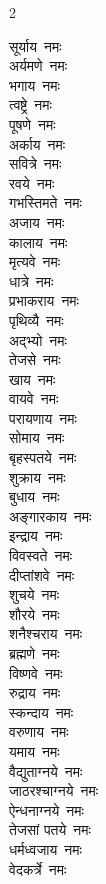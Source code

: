 \begin{multicols}{2}
    \begin{flushleft}
सूर्याय~नमः\\
अर्यमणे~नमः\\
भगाय~नमः\\
त्वष्ट्रे~नमः\\
पूषणे~नमः\\
अर्काय~नमः\\
सवित्रे~नमः\\
रवये~नमः\\
गभस्तिमते~नमः\\
अजाय~नमः\hfill{}\\
कालाय~नमः\\
मृत्यवे~नमः\\
धात्रे~नमः\\
प्रभाकराय~नमः\\
पृथिव्यै~नमः\\
अद्भ्यो~नमः\\
तेजसे~नमः\\
खाय~नमः\\
वायवे~नमः\\
परायणाय~नमः\hfill{}\\
सोमाय~नमः\\
बृहस्पतये~नमः\\
शुक्राय~नमः\\
बुधाय~नमः\\
अङ्गारकाय~नमः\\
इन्द्राय~नमः\\
विवस्वते~नमः\\
दीप्तांशवे~नमः\\
शुचये~नमः\\
शौरये~नमः\hfill{}\\
शनैश्चराय~नमः\\
ब्रह्मणे~नमः\\
विष्णवे~नमः\\
रुद्राय~नमः\\
स्कन्दाय~नमः\\
वरुणाय~नमः\\
यमाय~नमः\\
वैद्युताग्नये~नमः\\
जाठरश्चाग्नये~नमः\\
ऐन्धनाग्नये~नमः\hfill{}\\
तेजसां पतये~नमः\\
धर्मध्वजाय~नमः\\
वेदकर्त्रे~नमः\\

\end{flushleft}
\end{multicols}
